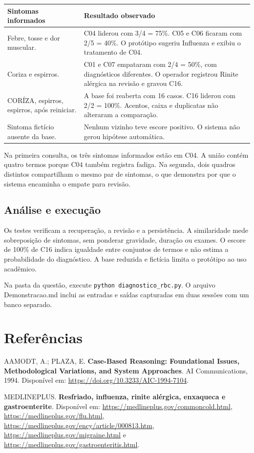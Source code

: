 \documentclass[12pt,a4paper]{article}
\begin{document}
\begin{table}[htbp]
    \centering
    \begin{tabular}{>{\raggedright\arraybackslash}p{4.6cm} >{\raggedright\arraybackslash}p{10.2cm}}
        \toprule
        \textbf{Sintomas informados} & \textbf{Resultado observado} \\
        \midrule
        Febre, tosse e dor muscular. & C04 liderou com 3/4 = 75\%. C05 e C06 ficaram com 2/5 = 40\%. O protótipo sugeriu Influenza e exibiu o tratamento de C04. \\
        \addlinespace
        Coriza e espirros. & C01 e C07 empataram com 2/4 = 50\%, com diagnósticos diferentes. O operador registrou Rinite alérgica na revisão e gravou C16. \\
        \addlinespace
        CORÍZA, espirros, espirros, após reiniciar. & A base foi reaberta com 16 casos. C16 liderou com 2/2 = 100\%. Acentos, caixa e duplicatas não alteraram a comparação. \\
        \addlinespace
        Sintoma fictício ausente da base. & Nenhum vizinho teve escore positivo. O sistema não gerou hipótese automática. \\
        \bottomrule
    \end{tabular}
\end{table}

Na primeira consulta, os três sintomas informados estão em C04. A união contém quatro termos porque C04 também registra fadiga. Na segunda, dois quadros distintos compartilham o mesmo par de sintomas, o que demonstra por que o sistema encaminha o empate para revisão.

\subsection{Análise e execução}

Os testes verificam a recuperação, a revisão e a persistência. A similaridade mede sobreposição de sintomas, sem ponderar gravidade, duração ou exames. O escore de 100\% de C16 indica igualdade entre conjuntos de termos e não estima a probabilidade do diagnóstico. A base reduzida e fictícia limita o protótipo ao uso acadêmico.

Na pasta da questão, execute \texttt{python diagnostico\_rbc.py}. O arquivo Demonstracao.md inclui as entradas e saídas capturadas em duas sessões com um banco separado.

\section*{Referências}

\noindent [1] AAMODT, A.; PLAZA, E. \textbf{Case-Based Reasoning: Foundational Issues, Methodological Variations, and System Approaches}. AI Communications, 1994. Disponível em: \url{https://doi.org/10.3233/AIC-1994-7104}.

\noindent [2] MEDLINEPLUS. \textbf{Resfriado, influenza, rinite alérgica, enxaqueca e gastroenterite}. Disponível em: \url{https://medlineplus.gov/commoncold.html}, \url{https://medlineplus.gov/flu.html}, \url{https://medlineplus.gov/ency/article/000813.htm}, \url{https://medlineplus.gov/migraine.html} e \url{https://medlineplus.gov/gastroenteritis.html}.
\end{document}

